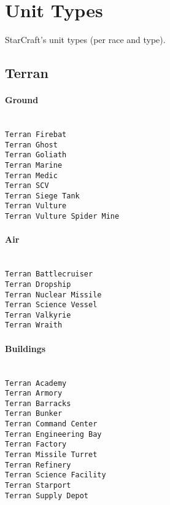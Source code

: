 \section{Unit Types}
\label{unittype}
StarCraft's unit types (per race and type).

\subsection{Terran}

\paragraph{Ground} \mbox{}\\
\verb|Terran Firebat| \\
\verb|Terran Ghost| \\
\verb|Terran Goliath| \\
\verb|Terran Marine| \\
\verb|Terran Medic| \\
\verb|Terran SCV| \\
\verb|Terran Siege Tank| \\
\verb|Terran Vulture| \\
\verb|Terran Vulture Spider Mine| \\

\paragraph{Air} \mbox{}\\
\verb|Terran Battlecruiser| \\
\verb|Terran Dropship| \\
\verb|Terran Nuclear Missile| \\
\verb|Terran Science Vessel| \\
\verb|Terran Valkyrie| \\
\verb|Terran Wraith|

\paragraph{Buildings} \mbox{}\\
\verb|Terran Academy| \\
\verb|Terran Armory| \\
\verb|Terran Barracks| \\
\verb|Terran Bunker| \\
\verb|Terran Command Center| \\
\verb|Terran Engineering Bay| \\
\verb|Terran Factory| \\
\verb|Terran Missile Turret| \\
\verb|Terran Refinery| \\
\verb|Terran Science Facility| \\
\verb|Terran Starport| \\
\verb|Terran Supply Depot|

